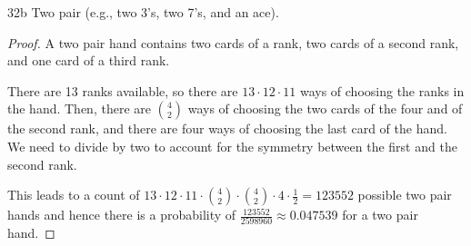 \begin{exercise}{32b}
Two pair (e.g., two 3’s, two 7’s, and an ace).
\end{exercise}

\begin{proof}
    A two pair hand contains two cards of a rank, two cards of a second rank, and one card of a third rank.

    There are 13 ranks available, so there are $13 \cdot 12 \cdot 11$ ways of choosing the ranks in the hand. Then, there are $4 \choose 2$ ways of choosing the two cards of the four and of the second rank, and there are four ways of choosing the last card of the hand. We need to divide by two to account for the symmetry between the first and the second rank.

    This leads to a count of $13 \cdot 12 \cdot 11 \cdot {4 \choose 2} \cdot {4 \choose 2} \cdot 4 \cdot \frac{1}{2}= 123552$ possible two pair hands and hence there is a probability of $\frac{123552}{2598960} \approx 0.047539$ for a two pair hand.
\end{proof}


